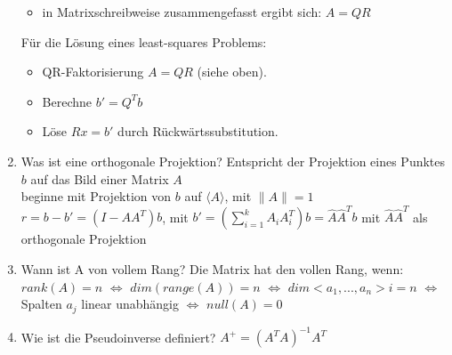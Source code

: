 \documentclass[10pt,a4paper,titlepage]{article}
\begin{document}
\begin{enumerate}[resume=b]
\begin{itemize}
	   \item in Matrixschreibweise zusammengefasst ergibt sich: $A = QR$
	\end{itemize}
        Für die Lösung eines least-squares Problems:
	\begin{itemize}
		\item QR-Faktorisierung $A=QR$ (siehe oben).
		\item Berechne $b' = Q^Tb$
		\item Löse $Rx = b'$ durch Rückwärtssubstitution.
	\end{itemize}
	\item Was ist eine orthogonale Projektion?\newline
	Entspricht der Projektion eines Punktes $b$ auf das Bild einer Matrix $A$\\
	beginne mit Projektion von $b$ auf $\langle A\rangle$, mit $\|A\|=1$\\
	$r=b-b'=(I-AA^T)b$, mit $b'=\left(\sum_{i=1}^{k}A_iA_i^T\right)b=\hat{A}\hat{A}^Tb$ mit $\hat{A}\hat{A}^T$ als orthogonale Projektion
	\item Wann ist A von vollem Rang? \newline 
	Die Matrix hat den vollen Rang, wenn: $rank ( A ) = n$ $\Leftrightarrow$ $dim ( range ( A )) = n$ $\Leftrightarrow$ $dim < a_1 , . . . , a_n> i = n$ $\Leftrightarrow$ Spalten $a_j$ linear unabhängig $\Leftrightarrow$ $null ( A ) = { 0 }$
	
	\item Wie ist die Pseudoinverse definiert?\newline
	\textbf{$A^+ = (A^T A)^{-1} A^T $}
\end{enumerate}
\end{document}
